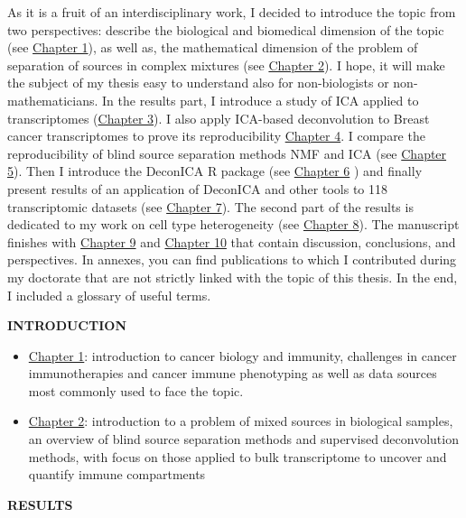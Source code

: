 \documentclass[12pt,]{book}
\theoremstyle{definition}
\theoremstyle{definition}
\theoremstyle{definition}
\theoremstyle{remark}
\begin{document}

As it is a fruit of an interdisciplinary work, I decided to introduce
the topic from two perspectives: describe the biological and biomedical
dimension of the topic (see \protect\hyperlink{intro}{Chapter 1}), as
well as, the mathematical dimension of the problem of separation of
sources in complex mixtures (see \protect\hyperlink{methods}{Chapter
2}). I hope, it will make the subject of my thesis easy to understand
also for non-biologists or non-mathematicians. In the results part, I
introduce a study of ICA applied to transcriptomes
(\protect\hyperlink{mstd}{Chapter 3}). I also apply ICA-based
deconvolution to Breast cancer transcriptomes to prove its
reproducibility \protect\hyperlink{LVA}{Chapter 4}. I compare the
reproducibility of blind source separation methods NMF and ICA (see
\protect\hyperlink{nmfica}{Chapter 5}). Then I introduce the DeconICA R
package (see \protect\hyperlink{deconica}{Chapter 6} ) and finally
present results of an application of DeconICA and other tools to 118
transcriptomic datasets (see \protect\hyperlink{results}{Chapter 7}).
The second part of the results is dedicated to my work on cell type
heterogeneity (see \protect\hyperlink{map}{Chapter 8}). The manuscript
finishes with \protect\hyperlink{discussiongenerale}{Chapter 9} and
\protect\hyperlink{conclusions}{Chapter 10} that contain discussion,
conclusions, and perspectives. In annexes, you can find publications to
which I contributed during my doctorate that are not strictly linked
with the topic of this thesis. In the end, I included a glossary of
useful terms.

\textbf{INTRODUCTION}

\begin{itemize}
\item
  \protect\hyperlink{intro}{Chapter 1}: introduction to cancer biology
  and immunity, challenges in cancer immunotherapies and cancer immune
  phenotyping as well as data sources most commonly used to face the
  topic.
\item
  \protect\hyperlink{methods}{Chapter 2}: introduction to a problem of
  mixed sources in biological samples, an overview of blind source
  separation methods and supervised deconvolution methods, with focus on
  those applied to bulk transcriptome to uncover and quantify immune
  compartments
\end{itemize}

\textbf{RESULTS}
\end{document}
